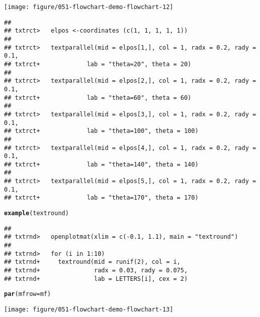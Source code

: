 \documentclass{article}\usepackage[]{graphicx}\usepackage[]{color}
\makeatletter
\def\maxwidth{ %
  \ifdim\Gin@nat@width>\linewidth
    \linewidth
  \else
    \Gin@nat@width
  \fi
}
\newcommand{\hlstd}[1]{\textcolor[rgb]{0.345,0.345,0.345}{#1}}%
\newcommand{\hlkwc}[1]{\textcolor[rgb]{0.333,0.667,0.333}{#1}}%
\newcommand{\hlkwd}[1]{\textcolor[rgb]{0.737,0.353,0.396}{\textbf{#1}}}%
\newenvironment{kframe}{%
 \def\at@end@of@kframe{}%
 \ifinner\ifhmode%
  \def\at@end@of@kframe{\end{minipage}}%
  \begin{minipage}{\columnwidth}%
 \fi\fi%
 \def\FrameCommand##1{\hskip\@totalleftmargin \hskip-\fboxsep
 \colorbox{shadecolor}{##1}\hskip-\fboxsep
     \hskip-\linewidth \hskip-\@totalleftmargin \hskip\columnwidth}%
 \MakeFramed {\advance\hsize-\width
   \@totalleftmargin\z@ \linewidth\hsize
   \@setminipage}}%
 {\par\unskip\endMakeFramed%
 \at@end@of@kframe}
\newenvironment{knitrout}{}{} %
\makeatother
\begin{document}
\begin{knitrout}
\texttt{[image: figure/051-flowchart-demo-flowchart-12]} 
\begin{kframe}\begin{verbatim}
## 
## txtrct>   elpos <-coordinates (c(1, 1, 1, 1, 1))
## 
## txtrct>   textparallel(mid = elpos[1,], col = 1, radx = 0.2, rady = 0.1,
## txtrct+             lab = "theta=20", theta = 20)
## 
## txtrct>   textparallel(mid = elpos[2,], col = 1, radx = 0.2, rady = 0.1,
## txtrct+             lab = "theta=60", theta = 60)
## 
## txtrct>   textparallel(mid = elpos[3,], col = 1, radx = 0.2, rady = 0.1,
## txtrct+             lab = "theta=100", theta = 100)
## 
## txtrct>   textparallel(mid = elpos[4,], col = 1, radx = 0.2, rady = 0.1,
## txtrct+             lab = "theta=140", theta = 140)
## 
## txtrct>   textparallel(mid = elpos[5,], col = 1, radx = 0.2, rady = 0.1,
## txtrct+             lab = "theta=170", theta = 170)
\end{verbatim}
\begin{alltt}
\hlkwd{example}\hlstd{(textround)}
\end{alltt}
\begin{verbatim}
## 
## txtrnd>   openplotmat(xlim = c(-0.1, 1.1), main = "textround")
## 
## txtrnd>   for (i in 1:10) 
## txtrnd+     textround(mid = runif(2), col = i, 
## txtrnd+               radx = 0.03, rady = 0.075,
## txtrnd+               lab = LETTERS[i], cex = 2)
\end{verbatim}
\begin{alltt}
\hlkwd{par}\hlstd{(}\hlkwc{mfrow} \hlstd{= mf)}
\end{alltt}
\end{kframe}
\texttt{[image: figure/051-flowchart-demo-flowchart-13]} 

\end{knitrout}
\end{document}
